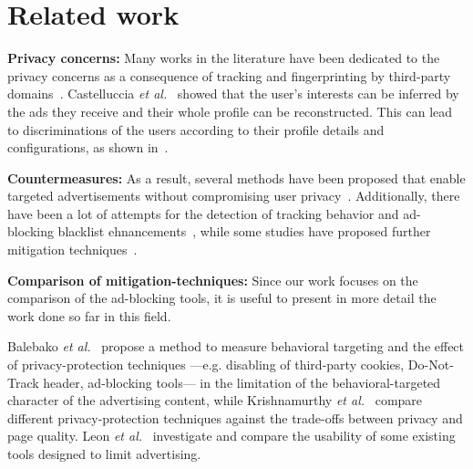 \documentclass[compsoc, conference, letterpaper, 10pt, times]{IEEEtran}
\begin{document}
\section{Related work}
\label{sec:related_work}


\textbf{Privacy concerns:} Many works in the literature have been dedicated to the privacy concerns as a consequence of tracking and fingerprinting by third-party domains~\cite{barford, englehardt, krishnamurthy_privacy_diffusion, nikiforakis, soltani, libert2015exposing}. Castelluccia \textit{et al.}~\cite{castelluccia} showed that the user's interests can be inferred by the ads they receive and their whole profile can be reconstructed. This can lead to discriminations of the users according to their profile details and configurations, as shown in~\cite{mikians, datta}.

\textbf{Countermeasures:} As a result, several methods have been proposed that enable targeted advertisements without compromising user privacy~\cite{adnostic, privad, nurikabe, haddadi, juels, androulaki}. Additionally, there have been a lot of attempts for the detection of tracking behavior and ad-blocking blacklist ehnancements~\cite{ma, gugelmann, tran}, while some studies have proposed further mitigation techniques~\cite{roesner, kontaxis}.

\textbf{Comparison of mitigation-techniques:} Since our work focuses on the comparison of the ad-blocking tools, it is useful to present in more detail the work done so far in this field.

Balebako \textit{et al.}~\cite{balebako} propose a method to measure behavioral targeting and the effect of privacy-protection techniques ---e.g. disabling of third-party cookies, Do-Not-Track header, ad-blocking tools--- in the limitation of the behavioral-targeted character of the advertising content, while Krishnamurthy \textit{et al.}~\cite{krishnamurthy_measuring_privacy_loss} compare different privacy-protection techniques against the trade-offs between privacy and page quality. Leon \textit{et al.}~\cite{leon} investigate and compare the usability of some existing tools designed to limit advertising.
\end{document}
